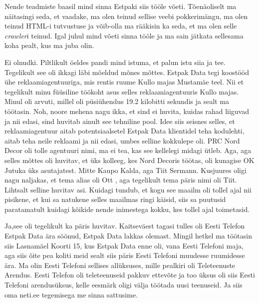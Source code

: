 Nende teadmiste baasil mind sinna Estpaki  siis tööle võeti. Tõenäoliselt ma  
näitasingi seda, et vaadake, ma olen teinud sellise veebi pokkerimängu, ma olen 
teinud HTML-i tutvustuse ja võib-olla ma rääkisin ka seda, et ma olen selle 
\emph{crawler}i teinud. Igal juhul mind võeti sinna tööle ja ma sain jätkata 
sellesama koha pealt, kus ma juba olin.


Ei olnudki. Piltlikult öeldes pandi mind  istuma, et palun istu siia ja tee. 
Tegelikult  see oli ikkagi läbi mõeldud mõnes mõttes. Estpak Data tegi koostööd ühe reklaamiagentuuriga, mis rentis ruume Kullo majas 
Mustamäe teel. Nii et tegelikult minu füüsiline töökoht  asus selles 
reklaamiagentuuris Kullo majas. Minul oli arvuti, millel oli püsiühendus 19.2 
kilobitti sekundis ja sealt ma töötasin. Noh, noore mehena nagu ikka, et sind 
ei huvita, kuidas rahad liiguvad ja nii edasi,  sind huvitab ainult see 
tehniline pool. Idee siis seisnes selles, et reklaamiagentuur aitab 
potentsiaalsetel Estpak Data klientidel teha kodulehti, aitab teha neile 
reklaami ja nii edasi, umbes selline kokkulepe oli. PRC Nord Decor 
oli tolle agentuuri nimi, ma ei tea, kas see kellelegi midagi ütleb. Aga, aga 
selles mõttes oli huvitav, et üks kolleeg, kes Nord Decoris töötas, oli kunagise 
OK Jutuka üks asutajatest. Mitte  
Kaupo Kalda, aga Tiit Sermann. Kusjuures oligi nagu naljakas, et tema alias oli Ott , aga tegelikult tema 
päris nimi oli Tiit. Lihtsalt selline huvitav asi. Kuidagi tundub, et kogu see 
maailm oli tollel ajal nii pisikene, et kui sa natukene selles maailmas ringi 
käisid, siis sa puutusid paratamatult kuidagi kõikide nende inimestega kokku, 
kes tollel ajal toimetasid.


Ja,see oli tegelikult ka päris huvitav. Kaitseväest tagasi tulles oli Eesti 
Telefon  Estpak Data ära söönud, Estpak 
Data lakkas olemast. Mingil hetkel ma töötasin siis Lasnamäel Koorti 15, kus 
Estpak Data enne oli, vana Eesti Telefoni maja, aga siis õite pea koliti meid 
sealt siis päris Eesti Telefoni muudesse ruumidesse ära. Ma olin Eesti Telefoni 
sellises allüksuses, mille pealkiri oli Teleteenuste Arendus.  Eesti Telefon 
oli teleteenuseid pakkuv ettevõte ja too üksus oli siis Eesti Telefoni 
arendusüksus, kelle eesmärk oligi välja töötada uusi teenuseid. Ja siis oma 
neti.ee tegemisega me sinna sattusime. 

